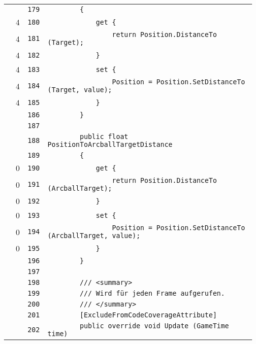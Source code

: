 \documentclass[a4paper,10pt]{article}
\begin{document}
\begin{longtable}[l]{lrrl}
\cellcolor{gray} &  & \verb~179~ & \verb~        {~\\
\cellcolor{green} & 4 & \verb~180~ & \verb~            get {~\\
\cellcolor{green} & 4 & \verb~181~ & \verb~                return Position.DistanceTo (Target);~\\
\cellcolor{green} & 4 & \verb~182~ & \verb~            }~\\
\cellcolor{green} & 4 & \verb~183~ & \verb~            set {~\\
\cellcolor{green} & 4 & \verb~184~ & \verb~                Position = Position.SetDistanceTo (Target, value);~\\
\cellcolor{green} & 4 & \verb~185~ & \verb~            }~\\
\cellcolor{gray} &  & \verb~186~ & \verb~        }~\\
\cellcolor{gray} &  & \verb~187~ & \verb~~\\
\cellcolor{gray} &  & \verb~188~ & \verb~        public float PositionToArcballTargetDistance~\\
\cellcolor{gray} &  & \verb~189~ & \verb~        {~\\
\cellcolor{red} & 0 & \verb~190~ & \verb~            get {~\\
\cellcolor{red} & 0 & \verb~191~ & \verb~                return Position.DistanceTo (ArcballTarget);~\\
\cellcolor{red} & 0 & \verb~192~ & \verb~            }~\\
\cellcolor{red} & 0 & \verb~193~ & \verb~            set {~\\
\cellcolor{red} & 0 & \verb~194~ & \verb~                Position = Position.SetDistanceTo (ArcballTarget, value);~\\
\cellcolor{red} & 0 & \verb~195~ & \verb~            }~\\
\cellcolor{gray} &  & \verb~196~ & \verb~        }~\\
\cellcolor{gray} &  & \verb~197~ & \verb~~\\
\cellcolor{gray} &  & \verb~198~ & \verb~        /// <summary>~\\
\cellcolor{gray} &  & \verb~199~ & \verb~        /// Wird für jeden Frame aufgerufen.~\\
\cellcolor{gray} &  & \verb~200~ & \verb~        /// </summary>~\\
\cellcolor{gray} &  & \verb~201~ & \verb~        [ExcludeFromCodeCoverageAttribute]~\\
\cellcolor{gray} &  & \verb~202~ & \verb~        public override void Update (GameTime time)~\\

\end{longtable}
\end{document}

